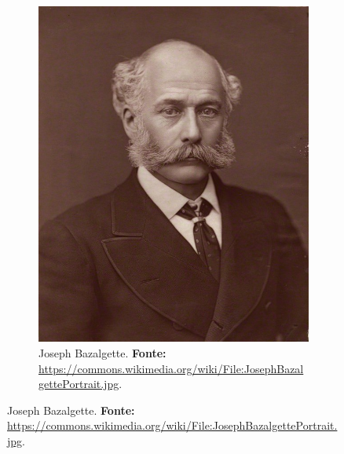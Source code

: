 \begin{figure}[!htp]
\begin{footnotesize}
\begin{subfigure}[b]{0.4\linewidth}
		\includegraphics[width=1\textwidth]{2-cap1/complementos/fotos/JosephBazalgettePortrait.jpg}  
		\caption{Joseph Bazalgette. \textbf{Fonte:} \url{https://commons.wikimedia.org/wiki/File:JosephBazalgettePortrait.jpg}.}
		\label{fig:josephbazalgette}
	\end{subfigure}	
\end{footnotesize}
\end{figure}

